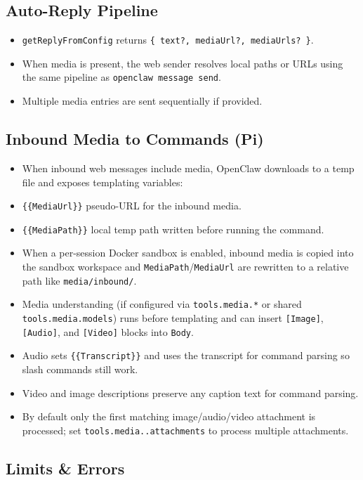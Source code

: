 \subsection{Auto-Reply Pipeline}


\begin{itemize}
  \item \texttt{getReplyFromConfig} returns \texttt{\{ text?, mediaUrl?, mediaUrls? \}}.
  \item When media is present, the web sender resolves local paths or URLs using the same pipeline as \texttt{openclaw message send}.
  \item Multiple media entries are sent sequentially if provided.
\end{itemize}


\subsection{Inbound Media to Commands (Pi)}


\begin{itemize}
  \item When inbound web messages include media, OpenClaw downloads to a temp file and exposes templating variables:
  \item \texttt{\{\{MediaUrl\}\}} pseudo-URL for the inbound media.
  \item \texttt{\{\{MediaPath\}\}} local temp path written before running the command.
  \item When a per-session Docker sandbox is enabled, inbound media is copied into the sandbox workspace and \texttt{MediaPath}/\texttt{MediaUrl} are rewritten to a relative path like \texttt{media/inbound/}.
  \item Media understanding (if configured via \texttt{tools.media.*} or shared \texttt{tools.media.models}) runs before templating and can insert \texttt{[Image]}, \texttt{[Audio]}, and \texttt{[Video]} blocks into \texttt{Body}.
  \item Audio sets \texttt{\{\{Transcript\}\}} and uses the transcript for command parsing so slash commands still work.
  \item Video and image descriptions preserve any caption text for command parsing.
  \item By default only the first matching image/audio/video attachment is processed; set \texttt{tools.media..attachments} to process multiple attachments.
\end{itemize}


\subsection{Limits \& Errors}


